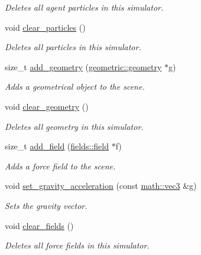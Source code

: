 \begin{DoxyCompactItemize}
\begin{DoxyCompactList}\small\item\em Deletes all agent particles in this simulator. \end{DoxyCompactList}\item 
void \hyperlink{classphysim_1_1simulator_ade81dc85cbad0e86fc38b29f48fedcd6}{clear\+\_\+particles} ()
\begin{DoxyCompactList}\small\item\em Deletes all particles in this simulator. \end{DoxyCompactList}\item 
size\+\_\+t \hyperlink{classphysim_1_1simulator_a92a79231495f047789176a19857735ff}{add\+\_\+geometry} (\hyperlink{classphysim_1_1geometric_1_1geometry}{geometric\+::geometry} $\ast$g)
\begin{DoxyCompactList}\small\item\em Adds a geometrical object to the scene. \end{DoxyCompactList}\item 
void \hyperlink{classphysim_1_1simulator_a8112f43801df68b3140458d1915c8d97}{clear\+\_\+geometry} ()
\begin{DoxyCompactList}\small\item\em Deletes all geometry in this simulator. \end{DoxyCompactList}\item 
size\+\_\+t \hyperlink{classphysim_1_1simulator_afb7ded1049ec82f7ea8d908c5cefaff7}{add\+\_\+field} (\hyperlink{classphysim_1_1fields_1_1field}{fields\+::field} $\ast$f)
\begin{DoxyCompactList}\small\item\em Adds a force field to the scene. \end{DoxyCompactList}\item 
void \hyperlink{classphysim_1_1simulator_a11d8e86465d367b9907bd541964d5a4b}{set\+\_\+gravity\+\_\+acceleration} (const \hyperlink{structphysim_1_1math_1_1vec3}{math\+::vec3} \&g)
\begin{DoxyCompactList}\small\item\em Sets the gravity vector. \end{DoxyCompactList}\item 
void \hyperlink{classphysim_1_1simulator_afe53c23ae11f78166576ad44f56ee953}{clear\+\_\+fields} ()
\begin{DoxyCompactList}\small\item\em Deletes all force fields in this simulator. \end{DoxyCompactList}\item 

\end{DoxyCompactItemize}
